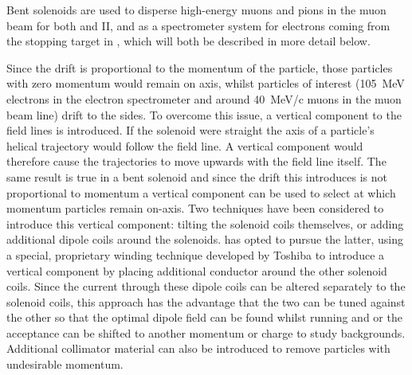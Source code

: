 Bent solenoids are used to disperse high-energy muons and pions in the muon
beam for both \phaseI and II, and as a spectrometer system for electrons coming
from the stopping target in \phaseII, which will both be described in more
detail below.

Since the drift is proportional to the momentum of the particle, those particles with zero momentum would remain on axis, whilst particles of interest (105~MeV electrons in the \phaseII electron spectrometer and around 40~MeV/c muons in the muon beam line) drift to the sides.  
To overcome this issue, a vertical component to the field lines is introduced.  
If the solenoid were straight the axis of a particle's helical trajectory would follow the field line. 
A vertical component would therefore cause the trajectories to move upwards with the field line itself.
The same result is true in a bent solenoid and since the drift this introduces is not proportional to momentum a vertical component can be used to select at which momentum particles remain on-axis.
Two techniques have been considered to introduce this vertical component: tilting the solenoid coils themselves, or adding additional dipole coils around the solenoids.
\COMET has opted to pursue the latter, using a special, proprietary winding technique developed by Toshiba to introduce a vertical component by placing additional conductor around the other solenoid coils.
Since the current through these dipole coils can be altered separately to the solenoid coils, this approach has the advantage that the two can be tuned against the other so that the optimal dipole field can be found whilst running and or the acceptance can be shifted to another momentum or charge to study backgrounds.
Additional collimator material can also be introduced to remove particles with undesirable momentum.

